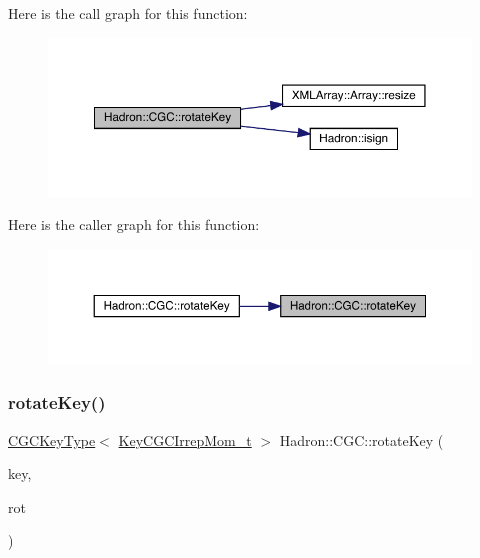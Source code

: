 Here is the call graph for this function\+:
\nopagebreak
\begin{figure}[H]
\begin{center}
\leavevmode
\includegraphics[width=350pt]{d9/d19/namespaceHadron_1_1CGC_acdc26e4dd88e281dc6675da8d6d1b13d_cgraph}
\end{center}
\end{figure}
Here is the caller graph for this function\+:
\nopagebreak
\begin{figure}[H]
\begin{center}
\leavevmode
\includegraphics[width=350pt]{d9/d19/namespaceHadron_1_1CGC_acdc26e4dd88e281dc6675da8d6d1b13d_icgraph}
\end{center}
\end{figure}
\mbox{\label{namespaceHadron_1_1CGC_ad5f1f6f8b8dd82238f3efeb03d1dc6e5}} 
\subsubsection{\texorpdfstring{rotateKey()}{rotateKey()}\hspace{0.1cm}{\footnotesize\ttfamily [2/2]}}
{\footnotesize\ttfamily \mbox{\hyperlink{structHadron_1_1CGCKeyType}{C\+G\+C\+Key\+Type}}$<$ \mbox{\hyperlink{structHadron_1_1KeyCGCIrrepMom__t}{Key\+C\+G\+C\+Irrep\+Mom\+\_\+t}} $>$ Hadron\+::\+C\+G\+C\+::rotate\+Key (\begin{DoxyParamCaption}\item[{const \mbox{\hyperlink{structHadron_1_1CGCKeyType}{C\+G\+C\+Key\+Type}}$<$ \mbox{\hyperlink{structHadron_1_1KeyCGCIrrepMom__t}{Key\+C\+G\+C\+Irrep\+Mom\+\_\+t}} $>$ \&}]{key,  }\item[{const \mbox{\hyperlink{structHadron_1_1RotateVec__t}{Rotate\+Vec\+\_\+t}} \&}]{rot }\end{DoxyParamCaption})}

